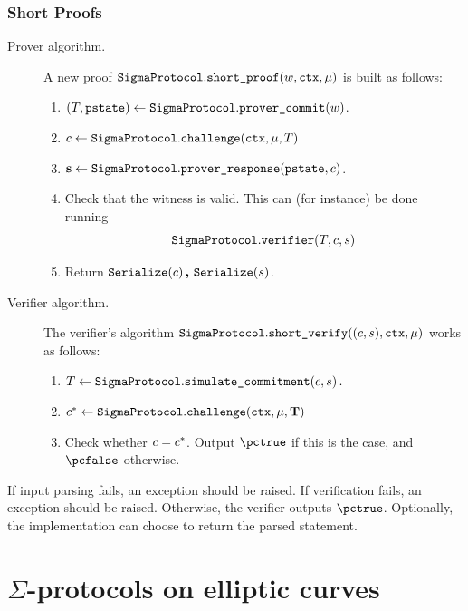 \documentclass[11pt]{article}
\begin{document}
\subsubsection{Short Proofs}
\begin{description}
\item[Prover algorithm.]
A new proof $\texttt{SigmaProtocol}.\texttt{short\_proof}(w,\texttt{ctx}, \mu)$ is built as follows:
\begin{enumerate}
  \item
     $(T,\texttt{pstate})\gets\texttt{SigmaProtocol}.\texttt{prover\_commit}(w)$.
  \item
   $c \gets \texttt{SigmaProtocol}.\texttt{challenge}(\texttt{ctx}, \mu,  T)$
  \item
     $\mathbf {s}\gets\texttt{SigmaProtocol}.\texttt{prover\_response}(\texttt{pstate},c)$.
    \item Check that the witness is valid. This can (for instance) be done running \[\texttt{SigmaProtocol}.\texttt{verifier}(T, c, s)\]
  \item
  Return $\texttt{Serialize}(c) \,\textbf{,}~ \texttt{Serialize}(s)$.
\end{enumerate}
\item[Verifier algorithm.] The verifier's algorithm $\texttt{SigmaProtocol}.\texttt{short\_verify}( (c, s), \texttt{ctx}, \mu)$ works as follows:
\begin{enumerate}
  \item $T \gets \texttt{SigmaProtocol}.\texttt{simulate\_commitment}(c, s)\,.$
  \item $c^* \gets \texttt{SigmaProtocol}.\texttt{challenge}(\texttt{ctx}, \mu, \mathbf {T})$
  \item
  Check whether $c=c^*$.
  Output $\accept$ if this is the case, and $\reject$ otherwise.
\end{enumerate}
\end{description}

If input parsing fails, an exception should be raised.
If verification fails, an exception should be raised.
Otherwise, the verifier outputs $\pctrue$. Optionally, the implementation can choose to return the parsed statement.





\section{$\Sigma$-protocols on elliptic curves}
\label{sec:instantiation}
\end{document}
